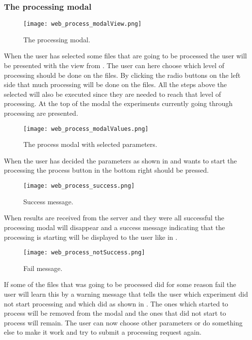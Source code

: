 \subsubsection{The processing modal}
\begin{figure}[h]
\centering
\texttt{[image: web\_process\_modalView.png]}
\caption{\label{fig:web_process_modalView}The processing modal.}
\end{figure}
\FloatBarrier
When the user has selected some files that are going to be processed the user will be presented with the view from . The user can here choose which level of processing should be done on the  files.
By clicking the radio buttons on the left side that much processing will be done on the  files. All the steps above the selected will also be executed since they are needed to reach that level of processing.
At the top of the modal the experiments currently going through processing are presented.
\begin{figure}[h]
\centering
\texttt{[image: web\_process\_modalValues.png]}
\caption{\label{fig:web_process_modalValues}The process modal with selected parameters.}
\end{figure}
\FloatBarrier
When the user has decided the parameters as shown in  and wants to start the processing the process button in the bottom right should be pressed. 
\begin{figure}[h]
\centering
\texttt{[image: web\_process\_success.png]}
\caption{\label{fig:web_process_success}Success message.}
\end{figure}
\FloatBarrier
When results are received from the server and they were all successful the processing modal will disappear and a success message indicating that the processing is starting will be displayed to the user like in .
\begin{figure}[h]
\centering
\texttt{[image: web\_process\_notSuccess.png]}
\caption{\label{fig:web_process_notSuccess}Fail message.}
\end{figure}
If some of the files that was going to be processed did for some reason fail the user will learn this by a warning message that tells the user which experiment did not start processing and which did as shown in . The ones which started to process will be removed from the modal and the ones that did not start to process will remain. The user can now choose other parameters or do something else to make it work and try to submit a processing request again.
\pagebreak



